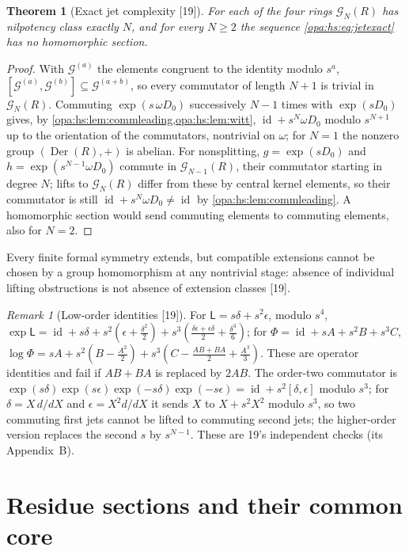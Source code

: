 \documentclass[11pt,oneside]{article}
\numberwithin{equation}{section}
\newtheorem{theorem}{Theorem}[section]
\theoremstyle{definition}
\theoremstyle{remark}
\newtheorem{remark}[remark]{Remark}
\newcommand{\id}{\operatorname{id}}
\newcommand{\src}[1]{\textup{\textsf{\small[#1]}}}
\newcommand{\Der}{\operatorname{Der}}
\begin{document}
\begin{theorem}[Exact jet complexity \src{19}]\label{opa:hs:thm:jetcomplexity}
For each of the four rings $\mathcal G_N(R)$ has nilpotency class exactly $N$, and for every $N\ge2$ the sequence \eqref{opa:hs:eq:jetexact} has no
homomorphic section.
\end{theorem}
\begin{proof}
With $\mathcal G^{(a)}$ the elements congruent to the identity modulo $s^a$, $[\mathcal G^{(a)},\mathcal G^{(b)}]\subseteq\mathcal G^{(a+b)}$, so every commutator of
length $N+1$ is trivial in $\mathcal G_N(R)$. Commuting $\exp(s\,\omega D_0)$ successively $N-1$ times with $\exp(sD_0)$ gives, by
\cref{opa:hs:lem:commleading,opa:hs:lem:witt}, $\id+s^N\omega D_0$ modulo $s^{N+1}$ up to the orientation of the commutators, nontrivial on $\omega$; for $N=1$
the nonzero group $(\Der(R),+)$ is abelian. For nonsplitting, $g=\exp(sD_0)$ and $h=\exp(s^{N-1}\omega D_0)$ commute in $\mathcal G_{N-1}(R)$, their
commutator starting in degree $N$; lifts to $\mathcal G_N(R)$ differ from these by central kernel elements, so their commutator is still
$\id+s^N\omega D_0\ne\id$ by \cref{opa:hs:lem:commleading}. A homomorphic section would send commuting elements to commuting elements, also for $N=2$.
\end{proof}

Every finite formal symmetry extends, but compatible extensions cannot be chosen by a group homomorphism at any nontrivial stage: absence of
individual lifting obstructions is not absence of extension classes \src{19}.

\begin{remark}[Low-order identities \src{19}]\label{opa:hs:rem:loworder}
For $\mathsf L=s\delta+s^2\epsilon$, modulo $s^4$,
$\exp\mathsf L=\id+s\delta+s^2(\epsilon+\frac{\delta^2}2)+s^3(\frac{\delta\epsilon+\epsilon\delta}2+\frac{\delta^3}6)$; for $\Phi=\id+sA+s^2B+s^3C$,
$\log\Phi=sA+s^2(B-\frac{A^2}2)+s^3(C-\frac{AB+BA}2+\frac{A^3}3)$. These are operator identities and fail if $AB+BA$ is replaced by $2AB$. The order-two
commutator is $\exp(s\delta)\exp(s\epsilon)\exp(-s\delta)\exp(-s\epsilon)=\id+s^2[\delta,\epsilon]$ modulo $s^3$; for $\delta=X\,d/dX$ and $\epsilon=X^2d/dX$ it
sends $X$ to $X+s^2X^2$ modulo $s^3$, so two commuting first jets cannot be lifted to commuting second jets; the higher-order version replaces the
second $s$ by $s^{N-1}$. These are 19's independent checks (its Appendix~B).
\end{remark}

\section{Residue sections and their common core}\label{opa:hs:sec:sections}
\end{document}

